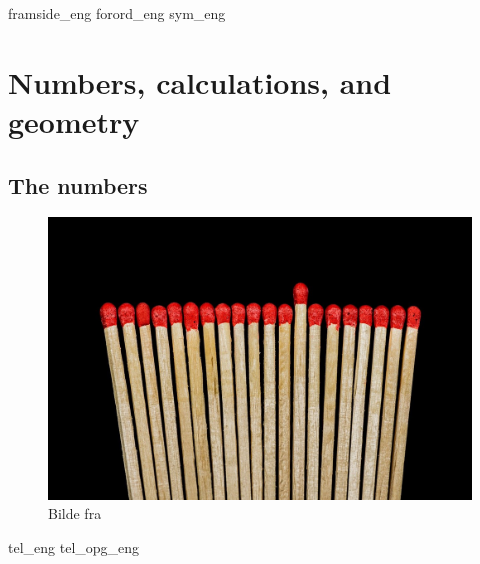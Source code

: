 





{framside_eng}
{forord_eng}
{sym_eng}
\newpage

{\footnotesize \tableofcontents}
\newpage
\part{Numbers, calculations, and geometry \label{Del1}}

\chapter{The numbers \label{Talavare}}
\begin{figure}
	\centering
	\includegraphics[scale=0.25]{sticks} \\
	{\footnotesize Bilde fra } 
\end{figure}
\newpage
{tel_eng}
{tel_opg_eng}

